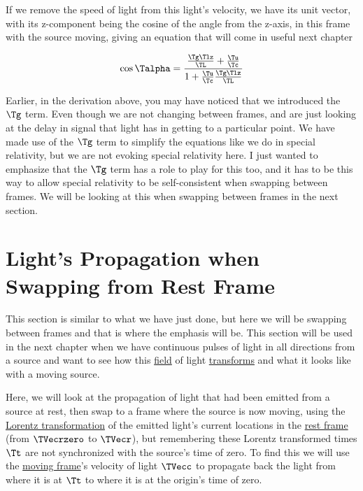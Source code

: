 If we remove the speed of light from this light's velocity, we have its unit vector, with its z-component being the cosine of the angle from the z-axis, in this frame with the source moving, giving an equation that will come in useful next chapter

\begin{equation}
	\label{eq: cos alpha prime in terms of l}
	\cos{\Talpha } = \frac{\frac{\Tg  \Tlz  }{\TL } + \frac{\Tu }{\Tc } }{1 + \frac{\Tu }{\Tc } \frac{\Tg  \Tlz  }{\TL } }
\end{equation}

Earlier, in the derivation above, you may have noticed that we introduced the $\Tg $ term.
Even though we are not changing between frames, and are just looking at the delay in signal that light has in getting to a particular point.
We have made use of the $\Tg $ term to simplify the equations like we do in special relativity, but we are not evoking special relativity here.
I just wanted to emphasize that the $\Tg $ term has a role to play for this too, and it has to be this way to allow special relativity to be self-consistent when swapping between frames.
We will be looking at this when swapping between frames in the next section.


\section{Light's Propagation when Swapping from Rest Frame}\label{subsect: Emitted Light When Swapping Frame}

This section is similar to what we have just done, but here we will be swapping between frames and that is where the emphasis will be.
This section will be used in the next chapter when we have continuous pulses of light in all directions from a source and want to see how this \hyperlink{def-field}{field} of light \hyperlink{def-transform}{transforms} and what it looks like with a moving source.

Here, we will look at the propagation of light that had been emitted from a source at rest, then swap to a frame where the source is now moving, using the \hyperlink{def-lorentz-transform}{Lorentz transformation} of the emitted light's current locations in the \hyperlink{def-proper-frame}{rest frame} (from $\TVecrzero $ to $\TVecr $), but remembering these Lorentz transformed times $\Tt $ are not synchronized with the source's time of zero.
To find this we will use the \hyperlink{def-Moving-Frame}{moving frame}'s velocity of light $\TVecc $ to propagate back the light from where it is at $\Tt $ to where it is at the origin's time of zero.


